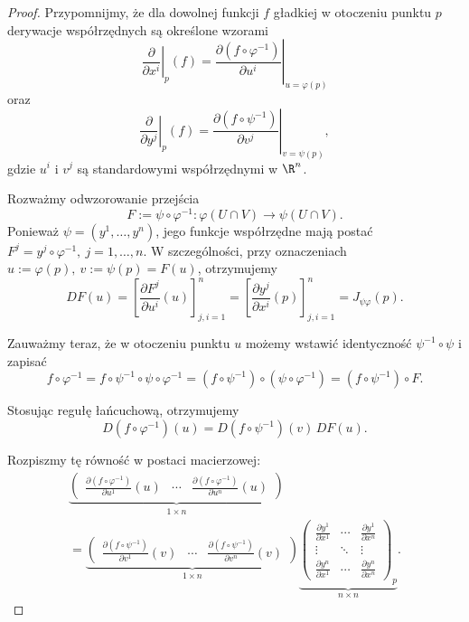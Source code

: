 \begin{proof}
Przypomnijmy, że dla dowolnej funkcji $f$ gładkiej
w otoczeniu punktu $p$ derywacje współrzędnych
są określone wzorami
\[
\left.\frac{\partial}{\partial x^i}\right|_p(f)
=
\left.
\frac{\partial(f\circ\varphi^{-1})}{\partial u^i}
\right|_{u=\varphi(p)}
\]
oraz
\[
\left.\frac{\partial}{\partial y^j}\right|_p(f)
=
\left.
\frac{\partial(f\circ\psi^{-1})}{\partial v^j}
\right|_{v=\psi(p)},
\]
gdzie $u^i$ i $v^j$ są standardowymi współrzędnymi
w $\R^n$.

Rozważmy odwzorowanie przejścia
\[
F:=\psi\circ\varphi^{-1}
\colon
\varphi(U\cap V)\longrightarrow\psi(U\cap V).
\]
Ponieważ $\psi=(y^1,\ldots,y^n)$,
jego funkcje współrzędne mają postać $F^j=y^j\circ\varphi^{-1}, \ j=1,\ldots,n$.
W szczególności, przy oznaczeniach $u:=\varphi(p), \ v:=\psi(p)=F(u)$,
otrzymujemy
\[
DF(u)
=
\left[
\frac{\partial F^j}{\partial u^i}(u)
\right]_{j,i=1}^n
=
\left[
\frac{\partial y^j}{\partial x^i}(p)
\right]_{j,i=1}^n
=
J_{\psi\varphi}(p).
\]

Zauważmy teraz, że w otoczeniu punktu $u$
możemy wstawić identyczność
$\psi^{-1}\circ\psi$ i zapisać
\[
f\circ\varphi^{-1}
=f\circ\psi^{-1}\circ\psi\circ\varphi^{-1}
=(f\circ\psi^{-1})\circ(\psi\circ\varphi^{-1})
=(f\circ\psi^{-1})\circ F.
\]

Stosując regułę łańcuchową, otrzymujemy
\[
\boxed{
D(f\circ\varphi^{-1})(u)
=
D(f\circ\psi^{-1})(v)\,DF(u).
}
\]

Rozpiszmy tę równość w postaci macierzowej:
\[
\begin{gathered}
\underbrace{
\begin{pmatrix}
\displaystyle
\frac{\partial(f\circ\varphi^{-1})}{\partial u^1}(u)
&
\cdots
&
\displaystyle
\frac{\partial(f\circ\varphi^{-1})}{\partial u^n}(u)
\end{pmatrix}
}_{1\times n}
\\[1mm]
=
\underbrace{
\begin{pmatrix}
\displaystyle
\frac{\partial(f\circ\psi^{-1})}{\partial v^1}(v)
&
\cdots
&
\displaystyle
\frac{\partial(f\circ\psi^{-1})}{\partial v^n}(v)
\end{pmatrix}
}_{1\times n}
\underbrace{
\begin{pmatrix}
\displaystyle\frac{\partial y^1}{\partial x^1}
&\cdots&
\displaystyle\frac{\partial y^1}{\partial x^n}
\\[2mm]
\vdots&\ddots&\vdots
\\[2mm]
\displaystyle\frac{\partial y^n}{\partial x^1}
&\cdots&
\displaystyle\frac{\partial y^n}{\partial x^n}
\end{pmatrix}_{\!p}
}_{n\times n}.
\end{gathered}
\]


\end{proof}

